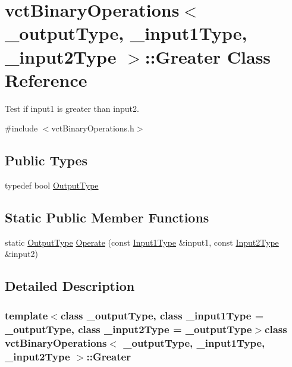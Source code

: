 \hypertarget{classvct_binary_operations_1_1_greater}{}\section{vct\+Binary\+Operations$<$ \+\_\+output\+Type, \+\_\+input1\+Type, \+\_\+input2\+Type $>$\+:\+:Greater Class Reference}
\label{classvct_binary_operations_1_1_greater}


Test if input1 is greater than input2.  




{\ttfamily \#include $<$vct\+Binary\+Operations.\+h$>$}

\subsection*{Public Types}
\begin{DoxyCompactItemize}
\item 
typedef bool \hyperlink{classvct_binary_operations_1_1_greater_ac6bbb1b038cdd55bc5fda5b024404ebe}{Output\+Type}
\end{DoxyCompactItemize}
\subsection*{Static Public Member Functions}
\begin{DoxyCompactItemize}
\item 
static \hyperlink{classvct_binary_operations_1_1_greater_ac6bbb1b038cdd55bc5fda5b024404ebe}{Output\+Type} \hyperlink{classvct_binary_operations_1_1_greater_ab901e65f312b9e551df7b57a25e3503d}{Operate} (const \hyperlink{classvct_binary_operations_a5e56a66a012d6a28c539a08a0021c45e}{Input1\+Type} \&input1, const \hyperlink{classvct_binary_operations_a929119af557a04a16b4d854981e49e1b}{Input2\+Type} \&input2)
\end{DoxyCompactItemize}


\subsection{Detailed Description}
\subsubsection*{template$<$class \+\_\+output\+Type, class \+\_\+input1\+Type = \+\_\+output\+Type, class \+\_\+input2\+Type = \+\_\+output\+Type$>$class vct\+Binary\+Operations$<$ \+\_\+output\+Type, \+\_\+input1\+Type, \+\_\+input2\+Type $>$\+::\+Greater}

